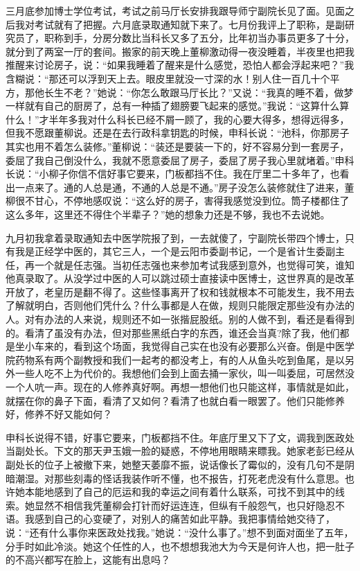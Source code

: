 \documentclass[12pt,oneside]{book}
\begin{document}
三月底参加博士学位考试，考试之前马厅长安排我跟导师宁副院长见了面。见面之后我对考试就有了把握。六月底录取通知就下来了。七月份我评上了职称，是副研究员了，职称到手，分房分数比当科长又多了五分，比年初当办事员更多了十分，就分到了两室一厅的套间。搬家的前天晚上董柳激动得一夜没睡着，半夜里也把我推醒来讨论房子，说：``如果我睡着了醒来是什么感觉，恐怕人都会浮起来吧？''我含糊说：``那还可以浮到天上去。眼皮里就没一寸深的水！别人住一百几十个平方，那他长生不老？''她说：``你怎么敢跟马厅长比？''又说：``我真的睡不着，做梦一样就有自己的厨房了，总有一种插了翅膀要飞起来的感觉。''我说：``这算什么算什么！''才半年多我对什么科长已经不屑一顾了，我的心要大得多，想得远得多，但我不愿跟董柳说。还是在去行政科拿钥匙的时候，申科长说：``池科，你那房子其实也用不着怎么装修。''董柳说：``装还是要装一下的，好不容易分到一套房子，委屈了我自己倒没什么，我就不愿意委屈了房子，委屈了房子我心里就堵着。''申科长说：``小柳子你信不信好事它要来，门板都挡不住。我在厅里二十多年了，也看出一点来了。通的人总是通，不通的人总是不通。''房子没怎么装修就住了进来，董柳很不甘心，不停地感叹说：``这么好的房子，害得我感觉没到位。筒子楼都住了这么多年，这里还不得住个半辈子？''她的想象力还是不够，我也不去说她。

九月初我拿着录取通知去中医学院报了到，一去就傻了，宁副院长带四个博士，只有我是正经学中医的，其它三人，一个是云阳市委副书记，一个是省计生委副主任，再一个就是任志强。当初任志强也来参加考试我感到意外，也觉得可笑，谁知他真录取了。从没学过中医的人可以跳过硕士直接读中医博士，这世界真的是改革开放了，老皇历是翻不得了。这些怪事离开了权和钱就根本不可能发生，我不用去了解就明白，否则他们凭什么？什么事都是人在做，规则只能限定那些没有办法的人。对有办法的人来说，规则还不如一张揩屁股纸。别的人做不到，看还是看得到的。看清了虽没有办法，但对那些黑纸白字的东西，谁还会当真?除了我，他们都是坐小车来的，看到这个场面，我觉得自己实在也没有必要那么兴奋。倒是中医学院药物系有两个副教授和我们一起考的都没考上，有的人从鱼头吃到鱼尾，是以另外一些人吃不上为代价的。我想他们会到上面去捅一家伙，叫一叫委屈，可居然没一个人吭一声。现在的人修养真好啊。再想一想他们也只能这样，事情就是如此，就摆在你的鼻子下面，看清了又如何？看清了也就白看一眼罢了。他们只能修养好，修养不好又能如何？

申科长说得不错，好事它要来，门板都挡不住。年底厅里又下了文，调我到医政处当副处长。下文的那天尹玉娥一脸的疑惑，不停地用眼睛来瞟我。她家老彭已经从副处长的位子上被撤下来，她整天萎靡不振，说话像长了霉似的，没有几句不是阴暗潮湿。对那些刻毒的怪话我装作听不懂，也不报告，打死老虎没有什么意思。也许她本能地感到了自己的厄运和我的幸运之间有着什么联系，可找不到其中的线索。她显然不相信我凭董柳会打针而好运连连，但纵有千般怨气，也只好隐忍不语。我感到自己的心变硬了，对别人的痛苦如此平静。我把事情给她交待了，说：``还有什么事你来医政处找我。''她说：``没什么事了。''想不到面对面坐了五年，分手时如此冷淡。她这个任性的人，也不想想我池大为今天是何许人也，把一肚子的不高兴都写在脸上，这能有出息吗？
\end{document}
